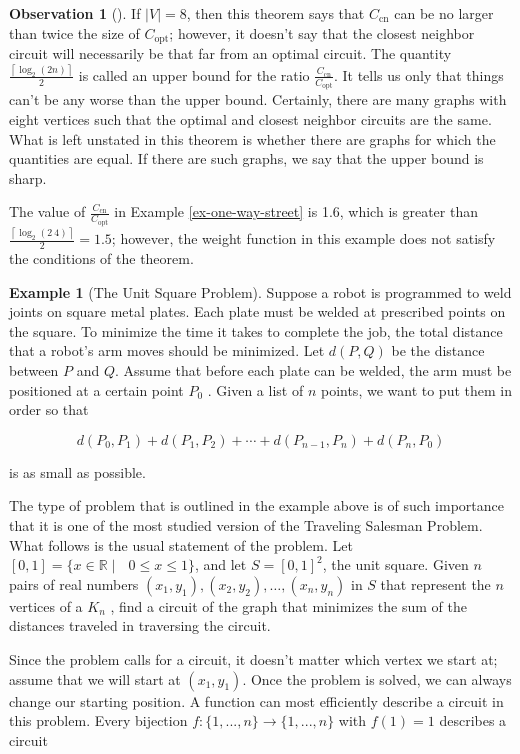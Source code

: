\documentclass[10pt,]{book}
\theoremstyle{plain}
\theoremstyle{definition}
\theoremstyle{definition}
\newtheorem{observation}[theorem]{Observation}
\theoremstyle{definition}
\newtheorem{example}[theorem]{Example}
\theoremstyle{definition}
\theoremstyle{definition}
\numberwithin{equation}{section}
\begin{document}
\begin{observation}[]\label{observation-1}
If \(|V|=8\), then this theorem says that \(C_{\text{cn}}\) can be no larger than twice the size of \(C_{\text{opt}}\); however,
it doesn't say that the closest neighbor circuit will necessarily be that far from an optimal circuit. The quantity \(\frac{\left\lceil \log _2 (2n)\right\rceil
}{2}\) is called an upper bound for the ratio \(\frac{C_{\text{cn}}}{C_{\text{opt}}}\). It tells us only that things can't be any worse than the
upper bound. Certainly, there are many graphs with eight vertices such that the optimal and closest neighbor circuits are the same. What is left
unstated in this theorem is whether there are graphs for which the quantities are equal. If there are such graphs, we say that the upper
bound is  sharp.%
\par
 The value of \(\frac{C_{\text{cn}}}{C_{\text{opt}}}\) in Example \hyperref[ex-one-way-street]{\ref{ex-one-way-street}} is 1.6, which is greater than \(\frac{\left\lceil \log _2 (2\ 4)\right\rceil
}{2} = 1.5\); however, the weight function in this example does not satisfy the conditions of the theorem.%
\end{observation}
\begin{example}[The Unit Square Problem]\label{ex-unit-square}
Suppose a robot is programmed to weld joints on square metal plates. Each plate must be welded at prescribed points on the square.
To minimize the time it takes to complete the job, the total distance that a robot's arm moves should be minimized. Let \(d(P, Q)\) be the distance
between \(P\) and \(Q\). Assume that before each plate can be welded, the arm must be positioned at a certain point \(P_0\) . Given
a list of \(n\) points, we want to put them in order so that



      \[d\left(P _0,P_1\right) + d\left(P_1,P _2 \right) +\cdots +d\left(P_{n-1},P_n\right)+ d\left(P_n ,P _0 \right)\]

is as small as possible.%
\end{example}
\par
The type of problem that is outlined in the example above is of such importance that it is one of the most studied version of the Traveling Salesman Problem. What follows is the usual statement of the problem. Let \([0, 1] = \{x \in \mathbb{R} \mid \text{  }0 \leq x\leq  1\}\), and let \(S = [0,1]^2\), the unit square. Given \(n\) pairs of real numbers \(\left(x_1, y_1\right),\left(x_2,y_2\right), \dots , \left(x_n,y_n\right)\)
in \(S\) that represent the \(n\) vertices of a \(K_n\) , find a circuit of the graph that minimizes the sum of the distances traveled
in traversing the circuit.%
\par
Since the problem calls for a circuit, it doesn't matter which vertex we start at; assume that we will start at \(\left(x_1,y_1\right)\). Once the
problem is solved, we can always change our starting position. A function can most efficiently describe a circuit in this problem. Every bijection
\(f: \{1, . . . , n\} \to  \{1, . . . , n\}\) with \(f(1) = 1\) describes a circuit
\end{document}
